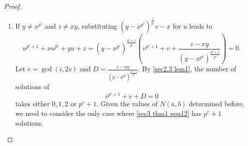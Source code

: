 \documentclass[sn-mathphys-num]{sn-jnl}%
\theoremstyle{thmstyleone}%
\theoremstyle{thmstyletwo}%
\theoremstyle{thmstylethree}%
\begin{document}
\begin{proof}
\begin{enumerate}[label = \bf Case \arabic*:, leftmargin=4.1em]
\begin{enumerate}[label=\bf Case 3.\arabic*:]
\begin{equation}
			\end{equation}
			If $e \nmid q+1$, then it follows from \cref{sec2.2 lem3} that $e=p^{\gcd(i,2s)}+1$ since $1 \mid q+1$ if $p$ is even and $2 \mid q+1$ if $p$ is odd. Recall that $m=\gcd(i,s)$. If $\gcd(i,2s)=m$, then $p^m+1 \nmid q+1$, which indicates that $\frac{s}{m}$ is even by \cref{sec2.2 lem2}. If $\gcd(i,2s)=2m$, then $\frac{s}{m}$ is even as $\frac{2s}{\gcd(i,2s)}$ is even according to \cref{sec2.2 lem3}. Thus, $q+1 \equiv (p^m)^{\frac{s}{m}}+1 \equiv (-1)^{\frac{s}{m}}+1 \equiv 2 \bmod e$. Hence, we have $\alpha^{\frac{q^2-1}{e}k(q+1)}=\alpha^{2\frac{q^2-1} {e}k}$ and $\alpha^{\frac{q^2-1}{e}kq}=\alpha^{\frac{q^2-1}{e}k}$. Then \cref{sec3 thm1 equ9} leads to
			\begin{equation}\label{sec3 thm1 equ11}
				v_0^{q+1}\cdot\left(\alpha^{\frac{q^2-1}{e}k}\right)^2-\left(xv_0^q+x^qv_0\right)\cdot\alpha^{\frac{q^2-1}{e}k}+x^{q+1}-1=0.
			\end{equation}
			Combining \cref{sec3 thm1 equ10,sec3 thm1 equ11}, we have $N(a,b)\le2$, i.e., $N(a,b) \in \{0,1,2\}$.     
			
			\item If $y\ne x^{p^i}$ and $z\ne xy$, substituting $\left(y-x^{p^i}\right)^{\frac{1}{p^i}}v-x$ for $u$ leads to
			\begin{equation*}
				u^{p^i+1}+xu^{p^i}+yu+z
				=\left(y- x^{p^i}\right)^{\frac{p^i+1}{p^i}}\left(v^{p^i+1}+v+\frac{z-xy}{\left(y- x^{p^i}\right)^{\frac{p^i+1}{p^i}}}\right)=0.
			\end{equation*}
			Let $e=\gcd(i, 2s)$ and $D=\frac{z-xy}{\left(y- x^{p^i}\right)^{\frac{p^i+1}{p^i}}}$. By \cref{sec2.3 lem1}, the number of solutions of 
			\begin{equation}\label{sec3 thm1 equ12}
				v^{p^i+1}+v+D=0
			\end{equation} 
			takes either $0,1,2$ or $p^{e}+1$. Given the values of $N(a,b)$ determined before, we need to consider the only case where \cref{sec3 thm1 equ12} has $p^{e}+1$ solutions. 
			

\end{enumerate}
\end{enumerate}
\end{proof}
\end{document}
